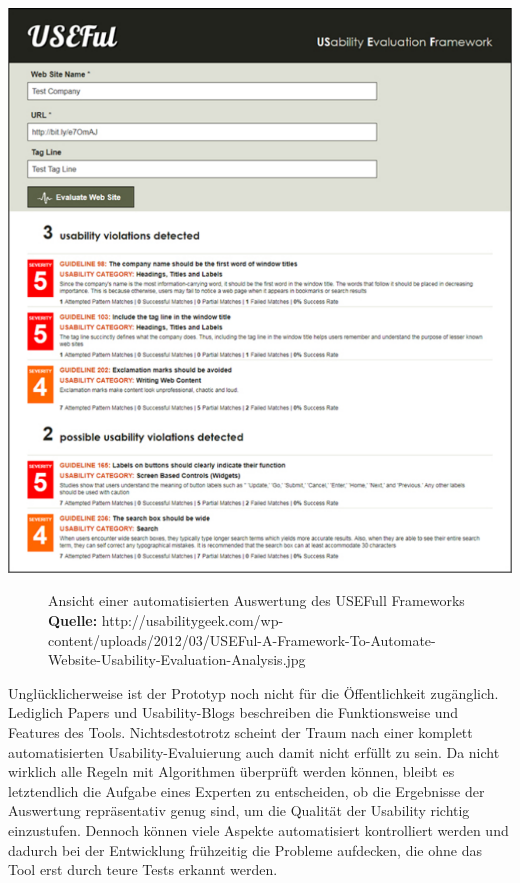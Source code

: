 \vspace{0.3cm}
\begin{center}
\includegraphics[scale=1]{./images/usefull}
\end{center}
\begin{figure}[htb]
   \centering
   \caption{Ansicht einer automatisierten Auswertung des USEFull Frameworks\\\textbf{Quelle:} http://usabilitygeek.com/wp-content/uploads/2012/03/USEFul-A-Framework-To-Automate-Website-Usability-Evaluation-Analysis.jpg}
    \label{usefull}
\end{figure}

Unglücklicherweise ist der Prototyp noch nicht für die Öffentlichkeit zugänglich. Lediglich Papers und Usability-Blogs beschreiben die Funktionsweise und Features des Tools. Nichtsdestotrotz scheint der Traum nach einer komplett automatisierten Usability-Evaluierung auch damit nicht erfüllt zu sein. Da nicht wirklich alle Regeln mit Algorithmen überprüft werden können, bleibt es letztendlich die Aufgabe eines Experten zu entscheiden, ob die Ergebnisse der Auswertung repräsentativ genug sind, um die Qualität der Usability richtig einzustufen. Dennoch können viele Aspekte automatisiert kontrolliert werden und dadurch bei der Entwicklung frühzeitig die Probleme aufdecken, die ohne das Tool erst durch teure Tests erkannt werden.